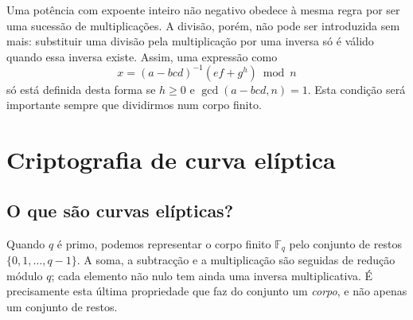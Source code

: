 Uma potência com expoente inteiro não negativo obedece à mesma regra por ser
uma sucessão de multiplicações. A divisão, porém, não pode ser introduzida sem
mais: substituir uma divisão pela multiplicação por uma inversa só é válido
quando essa inversa existe. Assim, uma expressão como
\[
x=(a-bcd)^{-1}(ef+g^h)\bmod n
\]
só está definida desta forma se \(h\geq0\) e
\(\gcd(a-bcd,n)=1\). Esta condição será importante sempre que dividirmos num
corpo finito.

\section{Criptografia de curva elíptica}
\label{EllipticCurveCryptography}


\subsection{O que são curvas elípticas?}
\label{elliptic_curves_section}

%
Quando \(q\) é primo, podemos representar o corpo
finito \(\mathbb{F}_q\)
 pelo conjunto de
restos \(\{0,1,\ldots,q-1\}\). A soma, a subtracção e a multiplicação são
seguidas de redução módulo \(q\); cada elemento não nulo tem ainda uma inversa
multiplicativa. É precisamente esta última propriedade que faz do conjunto um
{\em corpo}, e não apenas um conjunto de restos.

